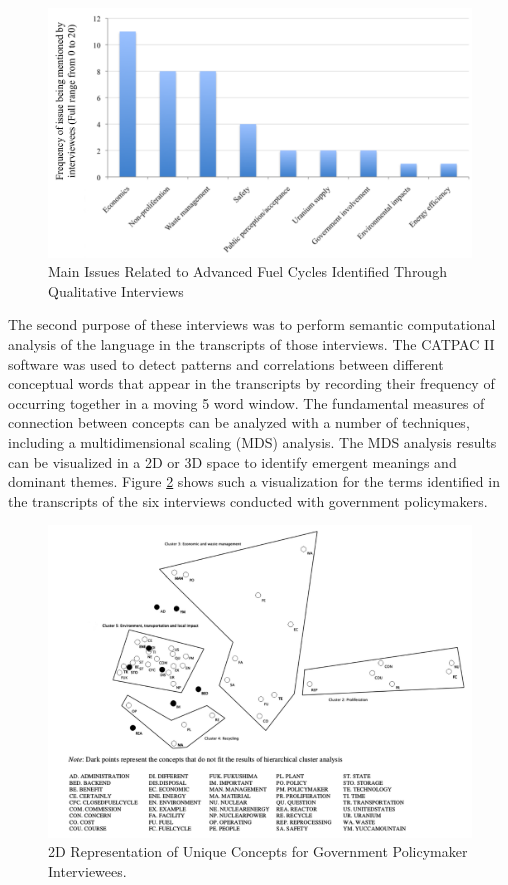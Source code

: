 \begin{figure}[htbp]
\begin{center}
\includegraphics[width=0.7\columnwidth]{./images/interview_2}
\caption{Main Issues Related to Advanced Fuel Cycles Identified Through Qualitative Interviews}
\end{center}
\label{fig:interview_2}
\end{figure}

The second purpose of these interviews was to perform semantic computational
analysis of the language in the transcripts of those interviews.  The CATPAC
II software was used to detect patterns and correlations between different
conceptual words that appear in the transcripts by recording their frequency
of occurring together in a moving 5 word window.  The fundamental measures of
connection between concepts can be analyzed with a number of techniques,
including a multidimensional scaling (MDS) analysis.  The MDS analysis results
can be visualized in a 2D or 3D space to identify emergent meanings and
dominant themes.  Figure \ref{fig:word_frequency_mds} shows such a
visualization for the terms identified in the transcripts of the six
interviews conducted with government policymakers.

\begin{figure}[htbp]
\begin{center}
\includegraphics[width=0.7\columnwidth]{./images/word_frequency_mds}
\caption{2D Representation of Unique Concepts for Government Policymaker Interviewees.}
\end{center}
\label{fig:word_frequency_mds}
\end{figure}

